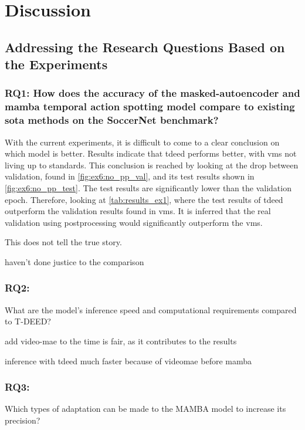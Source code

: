 \chapter{Discussion}
\label{chap:discussion}

\section{Addressing the Research Questions Based on the Experiments}


\subsection{\textbf{RQ1}:
How does the accuracy of the masked-autoencoder and mamba temporal action spotting model compare to existing \acrlong{sota} methods on the SoccerNet benchmark?}

With the current experiments, it is difficult to come to a clear conclusion on which model is better. Results indicate that \acrfull{tdeed} performs better, with \acrshort{vms} not living up to standards. This conclusion is reached by looking at the drop between validation, found in \cref{fig:ex6:no_pp_val}, and its test results shown in \cref{fig:ex6:no_pp_test}. The test results are significantly lower than the validation epoch. Therefore, looking at \cref{tab:results_ex1}, where the test results of \acrshort{tdeed} outperform the validation results found in \acrshort{vms}. It is inferred that the real validation using postprocessing would significantly outperform the \acrshort{vms}. 

This does not tell the true story. 

haven't done justice to the comparison


\subsection{RQ2:} 
What are the model’s inference speed and computational requirements compared to T-DEED?

add video-mae to the time is fair, as it contributes to the results

inference with tdeed much faster because of videomae before mamba


\subsection{RQ3:}
Which types of adaptation can be made to the MAMBA model to increase its precision?

